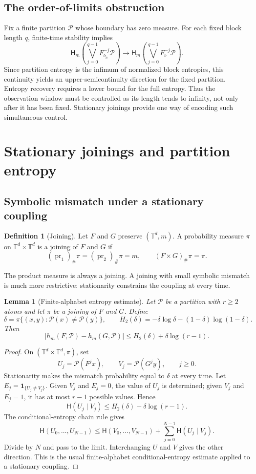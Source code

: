 \documentclass[review,12pt,times,a4paper,nopreprintline]{elsarticle}
\theoremstyle{plain}
\newtheorem{lemma}[theorem]{Lemma}
\theoremstyle{definition}
\newtheorem{definition}[theorem]{Definition}
\theoremstyle{remark}
\newcommand{\T}{\mathbb T}
\newcommand{\PP}{\mathcal P}
\newcommand{\Ent}{\mathsf H}
\numberwithin{equation}{section}
\begin{document}
\subsection{The order-of-limits obstruction}
Fix a finite partition $\PP$ whose boundary has zero measure. For each fixed block length $q$, finite-time stability implies
\[
 \Ent_m\!\left(\bigvee_{j=0}^{q-1}F_{b_n}^{-j}\PP\right)
 \longrightarrow
 \Ent_m\!\left(\bigvee_{j=0}^{q-1}F_b^{-j}\PP\right).
\]
Since partition entropy is the infimum of normalized block entropies, this continuity yields an upper-semicontinuity direction for the fixed partition. Entropy recovery requires a lower bound for the full entropy. Thus the observation window must be controlled as its length tends to infinity, not only after it has been fixed. Stationary joinings provide one way of encoding such simultaneous control.

\section{Stationary joinings and partition entropy}\label{sec:joining}
\subsection{Symbolic mismatch under a stationary coupling}
\begin{definition}[Joining]
Let $F$ and $G$ preserve $(\T^d,m)$. A probability measure $\pi$ on $\T^d\times\T^d$ is a joining of $F$ and $G$ if
\[
 (\operatorname{pr}_1)_\#\pi=(\operatorname{pr}_2)_\#\pi=m,
 \qquad (F\times G)_\#\pi=\pi.
\]
\end{definition}
The product measure is always a joining. A joining with small symbolic mismatch is much more restrictive: stationarity constrains the coupling at every time.

\begin{lemma}[Finite-alphabet entropy estimate]\label{lem:joining}
Let $\PP$ be a partition with $r\geq2$ atoms and let $\pi$ be a joining of $F$ and $G$. Define
\[
 \delta=\pi\{(x,y):\PP(x)\ne\PP(y)\},\qquad
 H_2(\delta)=-\delta\log\delta-(1-\delta)\log(1-\delta).
\]
Then
\begin{equation}\label{eq:fano}
 |h_m(F,\PP)-h_m(G,\PP)|
 \leq H_2(\delta)+\delta\log(r-1).
\end{equation}
\end{lemma}
\begin{proof}
On $(\T^d\times\T^d,\pi)$, set
\[
 U_j=\PP(F^jx),\qquad V_j=\PP(G^jy),\qquad j\geq0.
\]
Stationarity makes the mismatch probability equal to $\delta$ at every time. Let $E_j=\mathbf1_{\{U_j\ne V_j\}}$. Given $V_j$ and $E_j=0$, the value of $U_j$ is determined; given $V_j$ and $E_j=1$, it has at most $r-1$ possible values. Hence
\[
 \Ent(U_j\mid V_j)\leq H_2(\delta)+\delta\log(r-1).
\]
The conditional-entropy chain rule gives
\[
 \Ent(U_0,\ldots,U_{N-1})
 \leq\Ent(V_0,\ldots,V_{N-1})
 +\sum_{j=0}^{N-1}\Ent(U_j\mid V_j).
\]
Divide by $N$ and pass to the limit. Interchanging $U$ and $V$ gives the other direction. This is the usual finite-alphabet conditional-entropy estimate applied to a stationary coupling.
\end{proof}
\end{document}
